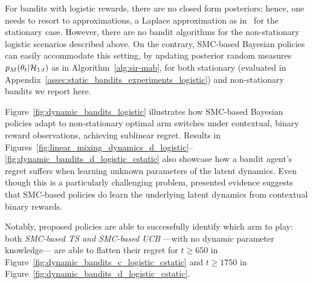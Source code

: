 For bandits with logistic rewards,
there are no closed form posteriors;
hence, one needs to resort to approximations,
\eg a Laplace approximation as in~\citep{ic-Chapelle2011} for the stationary case.
However, there are no bandit algorithms for the non-stationary logistic scenarios described above.
%
On the contrary, SMC-based Bayesian policies can easily accommodate this setting,
by updating posterior random measures $p_M(\theta_{t}|\mathcal{H}_{1:t})$ as in Algorithm~\ref{alg:sir-mab},
for both stationary (evaluated in Appendix~\ref{assec:static_bandits_experiments_logistic}) and non-stationary bandits we report here.

Figure~\ref{fig:dynamic_bandits_logistic} illustrates how
SMC-based Bayesian policies adapt to non-stationary optimal arm switches under contextual, binary reward observations,
achieving sublinear regret.
Results in Figures~\ref{fig:linear_mixing_dynamics_d_logistic}--\ref{fig:dynamic_bandits_d_logistic_cstatic}
also showcase how a bandit agent's regret suffers when learning unknown parameters of the latent dynamics.
%
Even though this is a particularly challenging problem,
presented evidence suggests that
SMC-based policies do learn the underlying latent dynamics from contextual binary rewards.

Notably, proposed policies are able to successfully identify which arm to play:
\ie both \textit{SMC-based TS and SMC-based UCB} ---with no dynamic parameter knowledge---
are able to flatten their regret
for $t\geq 650$ in Figure~\ref{fig:dynamic_bandits_c_logistic_cstatic} and
$t\geq 1750$ in Figure~\ref{fig:dynamic_bandits_d_logistic_cstatic}.

